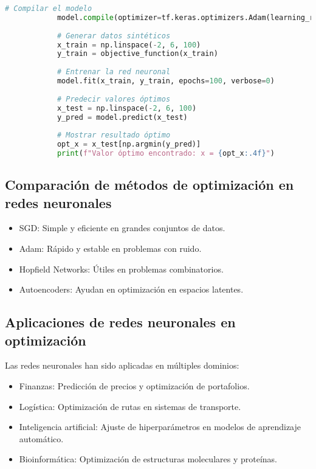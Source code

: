 \begin{itemize}
\begin{lstlisting}[language=Python, caption={Optimización de una función con una red neuronal en TensorFlow}]
			# Compilar el modelo
			model.compile(optimizer=tf.keras.optimizers.Adam(learning_rate=0.01), loss='mse')
			
			# Generar datos sintéticos
			x_train = np.linspace(-2, 6, 100)
			y_train = objective_function(x_train)
			
			# Entrenar la red neuronal
			model.fit(x_train, y_train, epochs=100, verbose=0)
			
			# Predecir valores óptimos
			x_test = np.linspace(-2, 6, 100)
			y_pred = model.predict(x_test)
			
			# Mostrar resultado óptimo
			opt_x = x_test[np.argmin(y_pred)]
			print(f"Valor óptimo encontrado: x = {opt_x:.4f}")
		\end{lstlisting}
		
		\subsection{Comparación de métodos de optimización en redes neuronales}
		
		\begin{itemize}
			\item SGD: Simple y eficiente en grandes conjuntos de datos.
			\item Adam: Rápido y estable en problemas con ruido.
			\item Hopfield Networks: Útiles en problemas combinatorios.
			\item Autoencoders: Ayudan en optimización en espacios latentes.
		\end{itemize}
		
		\subsection{Aplicaciones de redes neuronales en optimización}
		
		Las redes neuronales han sido aplicadas en múltiples dominios:
		
		\begin{itemize}
			\item Finanzas: Predicción de precios y optimización de portafolios.
			\item Logística: Optimización de rutas en sistemas de transporte.
			\item Inteligencia artificial: Ajuste de hiperparámetros en modelos de aprendizaje automático.
			\item Bioinformática: Optimización de estructuras moleculares y proteínas.
		\end{itemize}

\end{itemize}
